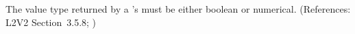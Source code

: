 The value type returned by a \FunctionDefinition's  must be
either boolean or numerical.  (References: L2V2 Section~3.5.8;
)
